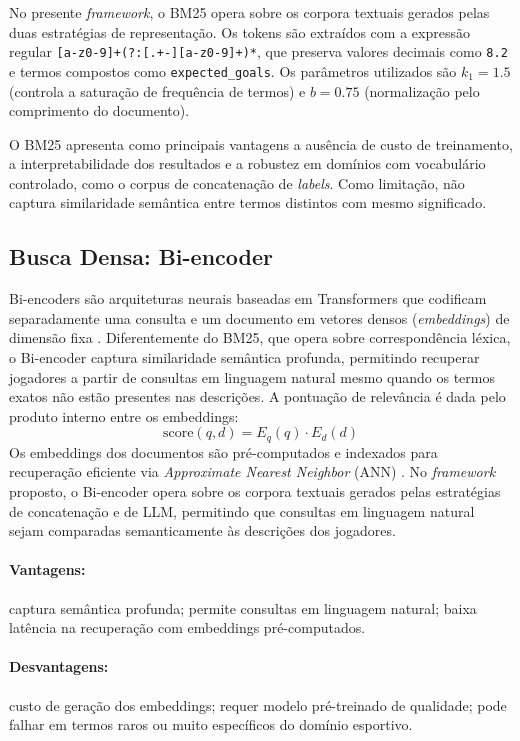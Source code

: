 \documentclass[portuguese]{sbc2025}
\begin{document}
No presente \textit{framework}, o BM25 opera sobre os corpora textuais gerados pelas
duas estratégias de representação. Os tokens são extraídos com a expressão regular
\texttt{[a-z0-9]+(?:[.+-][a-z0-9]+)*}, que preserva valores decimais como
\texttt{8.2} e termos compostos como \texttt{expected\_goals}. Os parâmetros utilizados
são $k_1 = 1.5$ (controla a saturação de frequência de termos) e $b = 0.75$
(normalização pelo comprimento do documento).

O BM25 apresenta como principais vantagens a ausência de custo de treinamento, a
interpretabilidade dos resultados e a robustez em domínios com vocabulário controlado,
como o corpus de concatenação de \textit{labels}. Como limitação, não captura
similaridade semântica entre termos distintos com mesmo significado.

\subsection{Busca Densa: Bi-encoder}

Bi-encoders são arquiteturas neurais baseadas em Transformers que codificam
separadamente uma consulta e um documento em vetores densos (\textit{embeddings})
de dimensão fixa \citep{reimers2019}. Diferentemente do BM25, que opera sobre
correspondência léxica, o Bi-encoder captura similaridade semântica profunda,
permitindo recuperar jogadores a partir de consultas em linguagem natural mesmo quando
os termos exatos não estão presentes nas descrições. A pontuação de relevância é
dada pelo produto interno entre os embeddings:
\[
  \text{score}(q, d) = E_q(q) \cdot E_d(d)
\]
Os embeddings dos documentos são pré-computados e indexados para recuperação eficiente
via \textit{Approximate Nearest Neighbor} (ANN) \citep{karpukhin2020}. No
\textit{framework} proposto, o Bi-encoder opera sobre os corpora textuais gerados
pelas estratégias de concatenação e de LLM, permitindo que consultas em linguagem
natural sejam comparadas semanticamente às descrições dos jogadores.

\paragraph{Vantagens:} captura semântica profunda; permite consultas em linguagem
natural; baixa latência na recuperação com embeddings pré-computados.

\paragraph{Desvantagens:} custo de geração dos embeddings; requer modelo pré-treinado
de qualidade; pode falhar em termos raros ou muito específicos do domínio esportivo.
\end{document}
